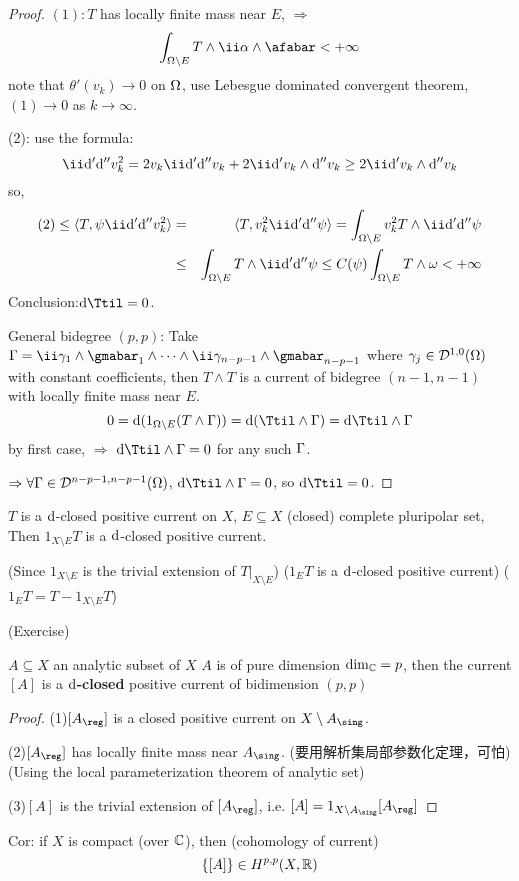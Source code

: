 \begin{proof}
$(1):T$ has locally finite mass near $E$, $\Rightarrow$
$$
  \int_{\Omg\setminus E}T\wedge\ii\afa\wedge\afabar
<+\infty
$$
note that $\theta'(v_k)\to 0$ on $\Omega$,
use Lebesgue dominated convergent theorem, $(1)\to 0$ as $k\to\infty$.

(2): use the formula:
$$
  \ii\td'\td'' v_k^2
=
  2v_k\ii\td'\td'' v_k+2\ii\td' v_k\wedge\td'' v_k
\geq 
  2\ii\td'v_k\wedge\td'' v_k
$$ 
so,
\begin{eqnarray*}
  (2)\leq \pair{T}{\psi\ii\td'\td'' v_k^2}
&=&
  \pair{T}{v_k^2\ii\td'\td''\psi}
=
  \int_{\Omg\setminus E}
    v_k^2T\wedge\ii\td'\td''\psi\\
&\leq&
  \int_{\Omg\setminus E}
    T\wedge\ii\td'\td''\psi
\leq
  C(\psi)\int_{\Omg\setminus E}T\wedge\omg
<+\infty
\end{eqnarray*}
Conclusion:$\td\Ttil=0$.

General bidegree $(p,p)$: Take $\Gma=\ii\gma_1
\wedge\gmabar_1\wedge\cdots\wedge\ii\gma_{n-p-1}\wedge\gmabar_{n-p-1}$
where $\gamma_j\in\mathcal{D}^{1,0}(\Omega)$ with constant coefficients,
then $T\wedge T$ is a current of bidegree $(n-1,n-1)$
with locally finite mass near $E$.
$$0=
  \td(1_{\Omg\setminus E}(T\wedge\Gma))
= \td(\Ttil\wedge\Gma)=\td\Ttil\wedge\Gma
$$
by first case, $\Rightarrow$
$\td\Ttil\wedge\Gma=0$ for any such $\Gamma$.

$\Rightarrow\forall \Gamma\in\mathcal{D}^{n-p-1,n-p-1}(\Omega)$,
$\td\Ttil\wedge\Gma=0$, so $\td\Ttil=0$.
\end{proof}

\begin{cor}
$T$ is a $\mathrm{d}$-closed positive current on $X$,
$E\subseteq X$ (closed) complete pluripolar set, Then
$1_{X\setminus E}T$ is a $\mathrm{d}$-closed positive current.
\end{cor}
(Since $1_{X\setminus E}$ is the trivial extension of $T|_{X\setminus E}$)
($1_{E}T$ is a $\mathrm{d}$-closed positive current)
($1_ET=T-1_{X\setminus E}T$)

\begin{cor}(Exercise)

$A\subseteq X$ an analytic subset of $X$
$A$ is of pure dimension $\dim_{\mathbb{C}}=p$, then the current 
$[A]$ is a \textbf{$\mathrm{d}$-closed} positive current of bidimension $(p,p)$
\end{cor}

\begin{proof}
(1)$[A_{\reg}]$ is a closed positive current on $X\setminus A_{\sing}$.

(2)$[A_{\reg}]$ has locally finite mass near $A_{\sing}$.
(要用解析集局部参数化定理，可怕)
(Using the local parameterization theorem of analytic set)

(3)$[A]$ is the trivial extension of $[A_{\reg}]$,
i.e. $[A]=1_{X\setminus A_{\sing}}[A_{\reg}]$
\end{proof}

Cor: if $X$ is compact (over $\mathbb{C}$), then (cohomology of current)
$$\{[A]\}\in H^{p,p}(X,\mathbb{R})$$


